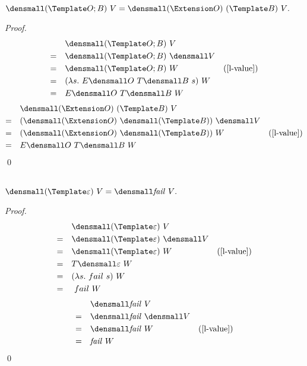 \begin{theorem}[] \\
    $ \den{(\Template O; B) ~ V} = \den{(\Extension O) ~ (\Template B) ~ V}.$
    \begin{proof}
        \begin{align*}
            &\quad \den{(\Template O; B) ~ V} \\
            =& \quad \den{(\Template O; B)} ~ \den{V} \\
            =& \quad \den{(\Template O; B)} ~ W & (\cref{l-value}) \\
            =& \quad (\lambda s. ~E\den{O} ~T\den{B} ~s) ~ W \\
            =& \quad E\den{O} ~T\den{B} ~W
        \end{align*}
        \begin{align*}
            &\quad  \den{(\Extension O) ~ (\Template B) ~ V} \\
            =& \quad (\den{(\Extension O)} ~ \den{(\Template B)}) ~ \den{V} \\
            =& \quad (\den{(\Extension O)} ~ \den{(\Template B)}) ~ W & (\cref{l-value})\\
            =& \quad E\den{O} ~ T\den{B} ~ W
        \end{align*}
        \qed
    \end{proof}
\end{theorem}

\begin{theorem}[] \\
    $ \den{(\Template \varepsilon) ~ V} = \den{\mathit{fail}~V}.$
    \begin{proof}
        \begin{align*}
            &\quad \den{(\Template \varepsilon) ~ V} \\
            =& \quad \den{(\Template \varepsilon)} ~ \den{V}\\
            =& \quad \den{(\Template \varepsilon)} ~ W & (\cref{l-value})\\
            =& \quad T\den{\varepsilon} ~ W \\
            =& \quad (\lambda s. ~fail ~s) ~ W \\
            =& \quad ~fail ~W 
        \end{align*}
        \begin{align*}
            &\quad \den{\mathit{fail}~V} \\
            =& \quad \den{\mathit{fail}} ~\den{V}\\
            =& \quad \den{\mathit{fail}} ~W  & (\cref{l-value})\\
            =& \quad \mathit{fail} ~W
        \end{align*}
        \qed
    \end{proof}
\end{theorem}

